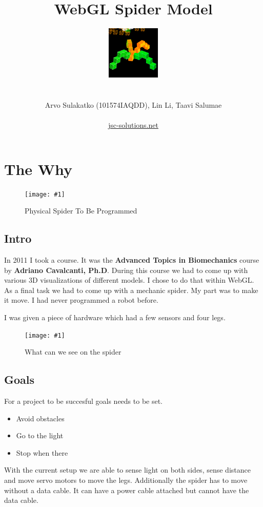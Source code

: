 \documentclass[12pt,leqno]{book}
\title{WebGL Spider Model}
\author{\includegraphics{../Design/Preview.png} \\ \\ \\ Arvo Sulakatko (101574IAQDD), Lin Li, Taavi Salumae \\ \\ \href{http://www.jsc-solutions.net}{jsc-solutions.net} }
\newcommand{\png}[1]{\texttt{[image: \#1]}}
\newcommand{\figpng}[2]{\begin{figure}[htb]\centering\png{#1}\caption{#2}\end{figure}}
\begin{document}
\maketitle



\tableofcontents
\listoffigures


\chapter{The Why}

\figpng{Images/www.youtube.comvhKksAVmekAE_-_Google_Chrome-2012-03-14_16.27.22}
{Physical Spider To Be Programmed}




\section{Intro}

In 2011 I took a course. It was the \textbf{Advanced Topics in Biomechanics} course by \textbf{Adriano Cavalcanti, Ph.D}. During this course we had to come up with various 3D visualizations of different models. I chose to do that within WebGL. As a final task we had to come up with a mechanic spider. My part was to make it move. I had never programmed a robot before. 

I was given a piece of hardware which had a few sensors and four legs.

\figpng{Images/parts}
{What can we see on the spider}




\section{Goals}

For a project to be succesful goals needs to be set.

\begin{itemize}
\item Avoid obstacles
\item Go to the light
\item Stop when there
\end{itemize}

With the current setup we are able to sense light on both sides, sense distance and move servo motors to move the legs. Additionally the spider has to move without a data cable. It can have a power cable attached but cannot have the data cable.
\end{document}
